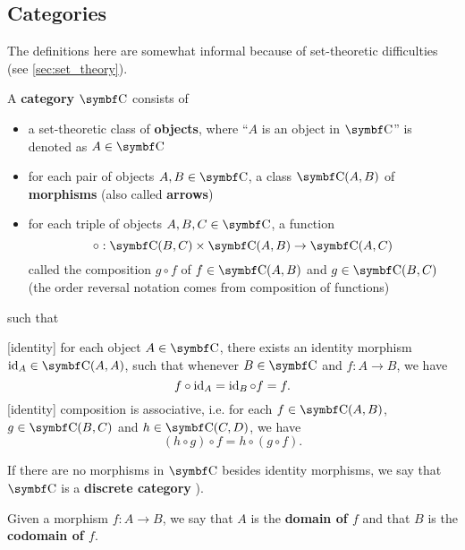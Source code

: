\subsection{Categories}\label{subsec:categories}

\begin{note}
  The definitions here are somewhat informal because of set-theoretic difficulties (see \cref{sec:set_theory}).
\end{note}

\begin{definition}\label{def:category}\cite[definition 1.1.1]{Leinster2014}
  A \textbf{category} \( \Bold C \) consists of
  \begin{itemize}
    \item a set-theoretic class of \textbf{objects}, where \enquote{\( A \) is an object in \( \Bold C \)} is denoted as \( A \in \Bold C \)
    \item for each pair of objects \( A, B \in \Bold C \), a class \( {\Bold C}(A, B) \) of \textbf{morphisms} (also called \textbf{arrows})
    \item for each triple of objects \( A, B, C \in \Bold C \), a function
    \begin{equation*}
      \circ: {\Bold C}(B, C) \times {\Bold C}(A, B) \to {\Bold C}(A, C)
    \end{equation*}
    called the composition \( g \circ f \) of \( f \in {\Bold C}(A, B) \) and \( g \in {\Bold C}(B, C) \) (the order reversal notation comes from composition of functions)
  \end{itemize}
  such that
  \begin{description}
    [identity] for each object \( A \in \Bold C \), there exists an identity morphism \( \Id_A \in {\Bold C}(A, A) \), such that whenever \( B \in \Bold{C} \) and \( f: A \to B \), we have
    \begin{equation*}
      f \circ \operatorname{id}_A = \operatorname{id}_B \circ f = f.
    \end{equation*}
    [identity] composition is associative, i.e. for each \( f \in {\Bold C}(A, B) \), \( g \in {\Bold C}(B, C) \) and \( h \in {\Bold C}(C, D) \), we have
    \begin{equation*}
      (h \circ g) \circ f = h \circ (g \circ f).
    \end{equation*}
  \end{description}

  If there are no morphisms in \( \Bold C \) besides identity morphisms, we say that \( \Bold C \) is a \textbf{discrete category} \cite[example 1.1.18(b]{Leinster2014}).

  Given a morphism \( f: A \to B \), we say that \( A \) is the \textbf{domain of \( f \)} and that \( B \) is the \textbf{codomain of \( f \)}.
\end{definition}

